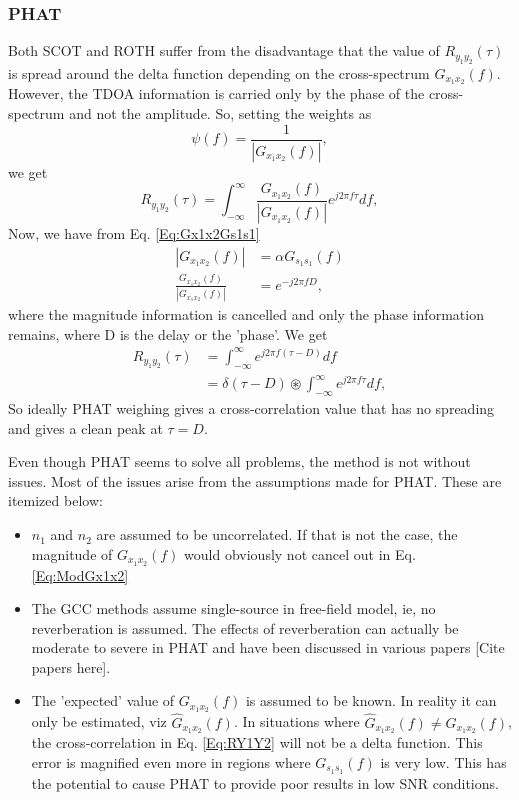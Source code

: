 \subsubsection{PHAT}
Both SCOT and ROTH suffer from the disadvantage that the value of ${R}_{y_1y_2}(\tau)$ is spread around the delta function depending on the cross-spectrum ${G}_{x_1x_2}(f)$. However, the TDOA information is carried only by the phase of the cross-spectrum and not the amplitude. So, setting the weights as
\begin{equation}
            \psi(f) = \frac{1}{|G_{x_1x_2}(f)|},
\end{equation}
we get
\begin{equation}
        {R}_{y_1y_2}(\tau) = \int_{-\infty}^{\infty}\frac{{G}_{x_1x_2}(f)}{|G_{x_1x_2}(f)|}e^{j2\pi f\tau}   df,
\end{equation}
Now, we have from Eq. \ref{Eq:Gx1x2Gs1s1}
\begin{equation}
\begin{split}
        |G_{x_1x_2}(f)| &= \alpha G_{s_1s_1}(f) \\
    \frac{{G}_{x_1x_2}(f)}{|G_{x_1x_2}(f)|}&=e^{-j2\pi fD},
\end{split}
\label{Eq:ModGx1x2}
\end{equation}
where the magnitude information is cancelled and only the phase information remains, where D is the delay or the 'phase'. We get
\begin{equation}
\begin{split}
            {R}_{y_1y_2}(\tau) &= \int_{-\infty}^{\infty}e^{j2\pi f(\tau - D)}   df \\
                           &=  \delta (\tau - D) \circledast \int_{-\infty}^{\infty}e^{j2\pi f\tau} df,
\end{split}
\label{Eq:RY1Y2}
\end{equation}
So ideally PHAT weighing gives a cross-correlation value that has no spreading and gives a clean peak at $\tau=D$.

Even though PHAT seems to solve all problems, the method is not without issues. Most of the issues arise from the assumptions made for PHAT. These are itemized below: 
\begin{itemize}
    \item $n_1$ and $n_2$ are assumed to be uncorrelated. If that is not the case, the magnitude of $G_{x_1x_2}(f)$ would obviously not cancel out in Eq. \ref{Eq:ModGx1x2}
    \item The GCC methods assume single-source in free-field model, ie, no reverberation is assumed. The effects of reverberation can actually be moderate to severe in PHAT and have been discussed in various papers [Cite papers here]. 
    \item The 'expected' value of $G_{x_1x_2}(f)$ is assumed to be known. In reality it can only be estimated, viz $\hat{G}_{x_1x_2}(f)$. In situations where $\hat{G}_{x_1x_2}(f) \neq G_{x_1x_2}(f)$, the cross-correlation in Eq. \ref{Eq:RY1Y2} will not be a delta function. This error is magnified even more in regions where $G_{s_1s_1}(f)$ is very low. This has the potential to cause PHAT to provide poor results in low SNR conditions.
\end{itemize}  


